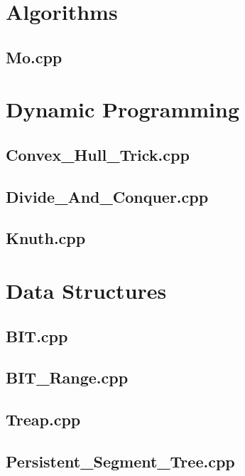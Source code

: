 \section{Algorithms}
\subsection{Mo.cpp}

\section{Dynamic Programming}
\subsection{Convex\_Hull\_Trick.cpp}

\subsection{Divide\_And\_Conquer.cpp}

\subsection{Knuth.cpp}

\section{Data Structures}
\subsection{BIT.cpp}

\subsection{BIT\_Range.cpp}

\subsection{Treap.cpp}

\subsection{Persistent\_Segment\_Tree.cpp}

